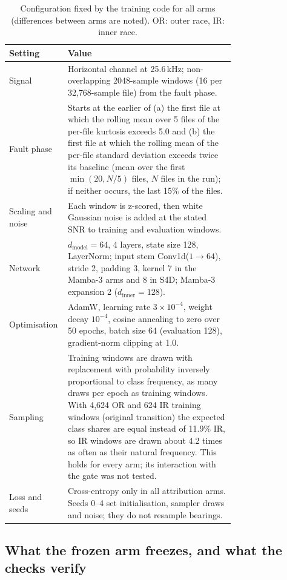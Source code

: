 \begin{table}[!ht]
\centering\footnotesize
\caption{Configuration fixed by the training code for all arms (differences between arms are noted). OR: outer race, IR: inner race.}
\label{tab:config}
\begin{tabular}{@{}lp{0.74\linewidth}@{}}
\toprule
Setting & Value \\
\midrule
Signal & Horizontal channel at 25.6\,kHz; non-overlapping 2048-sample windows (16 per 32{,}768-sample file) from the fault phase. \\
Fault phase & Starts at the earlier of (a) the first file at which the rolling mean over 5 files of the per-file kurtosis exceeds 5.0 and (b) the first file at which the rolling mean of the per-file standard deviation exceeds twice its baseline (mean over the first $\min(20, N/5)$ files, $N$ files in the run); if neither occurs, the last 15\% of the files. \\
Scaling and noise & Each window is z-scored, then white Gaussian noise is added at the stated SNR to training and evaluation windows. \\
Network & $d_{\mathrm{model}}=64$, 4 layers, state size 128, LayerNorm; input stem Conv1d($1\!\rightarrow\!64$), stride 2, padding 3, kernel 7 in the Mamba-3 arms and 8 in S4D; Mamba-3 expansion 2 ($d_{\mathrm{inner}}=128$). \\
Optimisation & AdamW, learning rate $3\times10^{-4}$, weight decay $10^{-4}$, cosine annealing to zero over 50 epochs, batch size 64 (evaluation 128), gradient-norm clipping at 1.0. \\
Sampling & Training windows are drawn with replacement with probability inversely proportional to class frequency, as many draws per epoch as training windows. With 4{,}624 OR and 624 IR training windows (original transition) the expected class shares are equal instead of 11.9\% IR, so IR windows are drawn about 4.2 times as often as their natural frequency. This holds for every arm; its interaction with the gate was not tested. \\
Loss and seeds & Cross-entropy only in all attribution arms. Seeds 0--4 set initialisation, sampler draws and noise; they do not resample bearings. \\
\bottomrule
\end{tabular}
\end{table}


\subsection{What the frozen arm freezes, and what the checks verify}
\label{sec:protocol:freeze}

